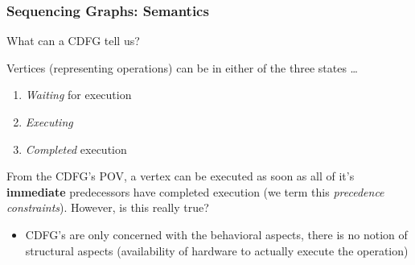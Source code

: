 \documentclass{article}
\begin{document}
\subsubsection{Sequencing Graphs: Semantics}
What can a CDFG tell us?

Vertices (representing operations) can be in either of the three states \dots
\begin{enumerate}
    \item \textit{Waiting} for execution
    \item \textit{Executing}
    \item \textit{Completed} execution
\end{enumerate}

From the CDFG's POV, a vertex can be executed as soon as all of it's \textbf{immediate} predecessors have completed execution (we term this \textit{precedence constraints}).
However, is this really true?

\begin{itemize}
    \item CDFG's are only concerned with the behavioral aspects, there is no notion of structural aspects (availability of hardware to actually execute the operation)
\end{itemize}

\newpage
\end{document}
